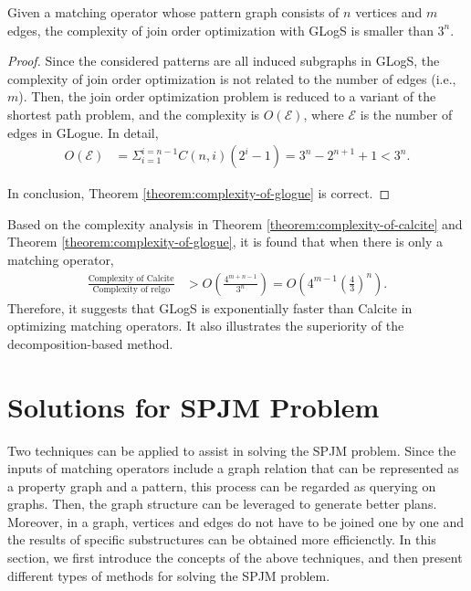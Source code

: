 \begin{theorem}
    \label{theorem:complexity-of-glogue}
    Given a matching operator whose pattern graph consists of $n$ vertices and $m$ edges, the complexity of join order optimization with GLogS is smaller than $3^n$.
\end{theorem}
\begin{proof}
    Since the considered patterns are all induced subgraphs in GLogS, the complexity of join order optimization is not related to the number of edges (i.e., $m$).
    Then, the join order optimization problem is reduced to a variant of the shortest path problem, and the complexity is $O(\mathcal{E})$, where $\mathcal{E}$ is the number of edges in GLogue.
    In detail,
    \begin{equation*}
        \begin{split}
            O(\mathcal{E}) & = \Sigma_{i=1}^{i=n-1}C(n, i)(2^i - 1) = 3^n - 2^{n+1} +1 < 3^n.
        \end{split}
    \end{equation*}

    In conclusion, Theorem \ref{theorem:complexity-of-glogue} is correct.

\end{proof}

Based on the complexity analysis in Theorem \ref{theorem:complexity-of-calcite} and Theorem \ref{theorem:complexity-of-glogue}, it is found that when there is only a matching operator,
\begin{equation*}
    \begin{split}
        \frac{\text{Complexity of Calcite}}{\text{Complexity of relgo}} & > O(\frac{4^{m+n-1}}{3^n}) = O(4^{m-1}(\frac{4}{3})^n).
    \end{split}
\end{equation*}
Therefore, it suggests that GLogS is exponentially faster than Calcite in optimizing matching operators.
It also illustrates the superiority of the decomposition-based method.

\iffalse
\section{Solutions for SPJM Problem}
Two techniques can be applied to assist in solving the SPJM problem.
Since the inputs of matching operators include a graph relation that can be represented as a property graph and a pattern, this process can be regarded as querying on graphs.
Then, the graph structure can be leveraged to generate better plans.
Moreover, in a graph, vertices and edges do not have to be joined one by one and the results of specific substructures can be obtained more efficienctly.
In this section, we first introduce the concepts of the above techniques, and then present different types of methods for solving the SPJM problem.

